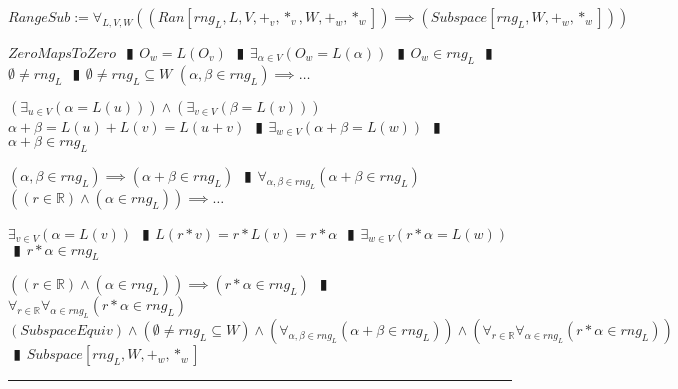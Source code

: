 \documentclass{book}
\newcommand{\abr}{:=}
\newcommand{\pipe}{$\phantom{(}\vrectangleblack\phantom{)}$}
\begin{document}
$RangeSub \abr \forall_{L, V, W}((Ran[rng_L, L, V, +_v, *_v, W, +_w, *_w]) \implies (Subspace[rng_L, W, +_w, *_w]))$
\begin{enumerate}
  \lit $ZeroMapsToZero$ \pipe $O_w = L(O_v)$ \pipe $\exists_{\alpha \in V}(O_w = L(\alpha))$ \pipe $O_w \in rng_L$ \pipe $\emptyset \neq rng_L$ \pipe $\emptyset \neq rng_L \subseteq W$
  \lit $(\alpha, \beta \in rng_L) \implies \ldots$
  \begin{enumerate}
    \lit $(\exists_{u \in V}(\alpha = L(u))) \land (\exists_{v \in V}(\beta = L(v)))$
    \lit $\alpha + \beta = L(u) + L(v) = L(u + v)$ \pipe $\exists_{w \in V}(\alpha + \beta = L(w))$ \pipe $\alpha + \beta \in rng_L$
  \end{enumerate}
  \lit $(\alpha, \beta \in rng_L) \implies (\alpha + \beta \in rng_L)$ \pipe $\forall_{\alpha, \beta \in rng_L}(\alpha + \beta \in rng_L)$
  \lit $((r \in \mathbb{R}) \land (\alpha \in rng_L)) \implies \ldots$
  \begin{enumerate}
    \lit $\exists_{v \in V}(\alpha = L(v))$ \pipe $L(r * v) = r * L(v) = r * \alpha$ \pipe $\exists_{w \in V}(r * \alpha = L(w))$ \pipe $r * \alpha \in rng_L$
  \end{enumerate}
  \lit $((r \in \mathbb{R}) \land (\alpha \in rng_L)) \implies (r * \alpha \in rng_L)$ \pipe $\forall_{r \in \mathbb{R}} \forall_{\alpha \in rng_L}(r * \alpha \in rng_L)$
  \lit $(SubspaceEquiv) \land (\emptyset \neq rng_L \subseteq W) \land (\forall_{\alpha, \beta \in rng_L}(\alpha + \beta \in rng_L)) \land (\forall_{r \in \mathbb{R}} \forall_{\alpha \in rng_L}(r * \alpha \in rng_L))$ \pipe $Subspace[rng_L, W, +_w, *_w]$
\end{enumerate} \vspace{.75mm} \hrule \vspace{.75mm} \ \\ 
\end{document}
